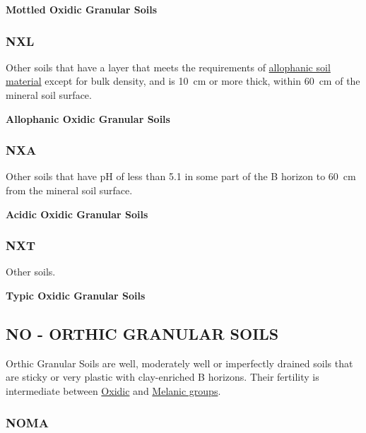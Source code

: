 \documentclass[
  letterpaper,
  DIV=11,
  numbers=noendperiod]{scrreprt}
\begin{document}
\textbf{Mottled Oxidic Granular Soils}

\hypertarget{sec-key-NXL}{%
\subsubsection{\texorpdfstring{\textbf{NXL}}{NXL}}\label{sec-key-NXL}}

Other soils that have a layer that meets the requirements of
\protect\hyperlink{sec-diag-alloph}{allophanic soil material} except for
bulk density, and is 10~cm or more thick, within 60~cm of the mineral
soil surface.

\textbf{Allophanic Oxidic Granular Soils}

\hypertarget{sec-key-NXA}{%
\subsubsection{\texorpdfstring{\textbf{NXA}}{NXA}}\label{sec-key-NXA}}

Other soils that have pH of less than 5.1 in some part of the B horizon
to 60~cm from the mineral soil surface.

\textbf{Acidic Oxidic Granular Soils}

\hypertarget{sec-key-NXT}{%
\subsubsection{\texorpdfstring{\textbf{NXT}}{NXT}}\label{sec-key-NXT}}

Other soils.

\textbf{Typic Oxidic Granular Soils}

\hypertarget{sec-NO}{%
\subsection{\texorpdfstring{\textbf{NO} - ORTHIC GRANULAR
SOILS}{NO - ORTHIC GRANULAR SOILS}}\label{sec-NO}}

Orthic Granular Soils are well, moderately well or imperfectly drained
soils that are sticky or very plastic with clay-enriched B horizons.
Their fertility is intermediate between
\protect\hyperlink{sec-NX}{Oxidic} and
\protect\hyperlink{sec-NE}{Melanic groups}.

\hypertarget{sec-key-NOMA}{%
\subsubsection{\texorpdfstring{\textbf{NOMA}}{NOMA}}\label{sec-key-NOMA}}
\end{document}
